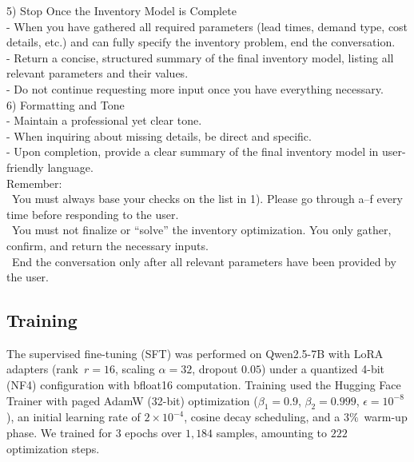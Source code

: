 \documentclass[mnsc,nonblindrev]{informs3_hide}
\begin{document}
\begin{APPENDICES}
\begin{table}[t]
\begin{tcolorbox}
    5) Stop Once the Inventory Model is Complete\\
    \quad - When you have gathered all required parameters (lead times, demand type, cost details, etc.) and can fully specify the inventory problem, end the conversation.\\
    \quad - Return a concise, structured summary of the final inventory model, listing all relevant parameters and their values.\\
    \quad - Do not continue requesting more input once you have everything necessary.\\[0pt]
    
    6) Formatting and Tone\\
    \quad - Maintain a professional yet clear tone.\\
    \quad - When inquiring about missing details, be direct and specific.\\
    \quad - Upon completion, provide a clear summary of the final inventory model in user-friendly language.\\[0pt]
    
    Remember:\\
    \quad \textbullet\ You must always base your checks on the list in 1). Please go through a--f every time before responding to the user.\\
    \quad \textbullet\ You must not finalize or ``solve'' the inventory optimization. You only gather, confirm, and return the necessary inputs.\\
    \quad \textbullet\ End the conversation only after all relevant parameters have been provided by the user.
    \end{tcolorbox}
    \caption{System prompt governing the conversational agent used in data collection.}
    \label{tab:system_prompt}
    \end{table}
    

    \subsection{Training}
    \label{sec:SFTtraining}

        The supervised fine-tuning (SFT) was performed on {\sf Qwen2.5-7B} with {\sf LoRA} adapters (rank~\mbox{$r=16$}, scaling $\alpha=32$, dropout $0.05$) under a quantized 4-bit ({\sf NF4}) configuration with {\sf bfloat16} computation. Training used the {\sf Hugging Face Trainer} with {\sf paged AdamW} (32-bit) optimization ($\beta_1 = 0.9$, $\beta_2 = 0.999$, $\epsilon = 10^{-8}$), an initial learning rate of $2\times 10^{-4}$, cosine decay scheduling, and a \mbox{$3\%$}~warm-up phase. We trained for $3$ epochs over $1,184$ samples, amounting to $222$ optimization steps.


\end{APPENDICES}
\end{document}
